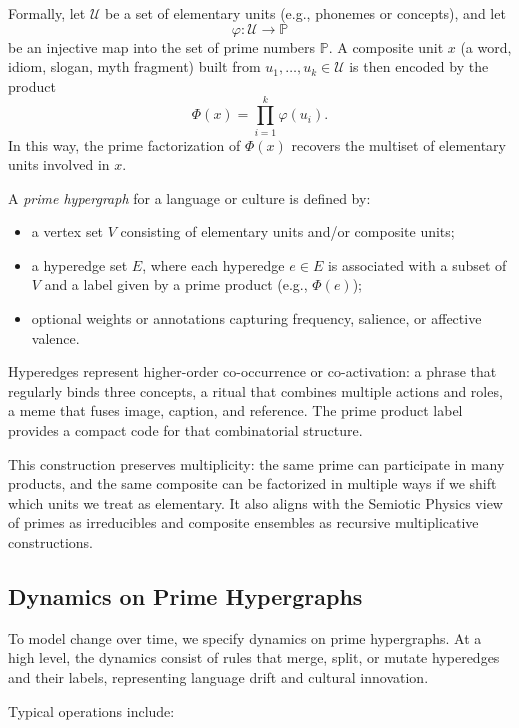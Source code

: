 \documentclass[12]{amsart}
\theoremstyle{plain}
\begin{document}
Formally, let $\mathcal{U}$ be a set of elementary units (e.g., phonemes or concepts), and let
\[
  \varphi : \mathcal{U} \to \mathbb{P}
\]
be an injective map into the set of prime numbers $\mathbb{P}$. A composite unit $x$ (a word, idiom, slogan, myth fragment) built from $u_1,\dots,u_k \in \mathcal{U}$ is then encoded by the product
\[
  \Phi(x) = \prod_{i=1}^k \varphi(u_i).
\]
In this way, the prime factorization of $\Phi(x)$ recovers the multiset of elementary units involved in $x$.

A \emph{prime hypergraph} for a language or culture is defined by:

\begin{itemize}
  \item a vertex set $V$ consisting of elementary units and/or composite units;
  \item a hyperedge set $E$, where each hyperedge $e \in E$ is associated with a subset of $V$ and a label given by a prime product (e.g., $\Phi(e)$);
  \item optional weights or annotations capturing frequency, salience, or affective valence.
\end{itemize}

Hyperedges represent higher-order co-occurrence or co-activation: a phrase that regularly binds three concepts, a ritual that combines multiple actions and roles, a meme that fuses image, caption, and reference. The prime product label provides a compact code for that combinatorial structure.

This construction preserves multiplicity: the same prime can participate in many products, and the same composite can be factorized in multiple ways if we shift which units we treat as elementary. It also aligns with the Semiotic Physics view of primes as irreducibles and composite ensembles as recursive multiplicative constructions.

\subsection{Dynamics on Prime Hypergraphs}

To model change over time, we specify dynamics on prime hypergraphs. At a high level, the dynamics consist of rules that merge, split, or mutate hyperedges and their labels, representing language drift and cultural innovation.

Typical operations include:
\end{document}
